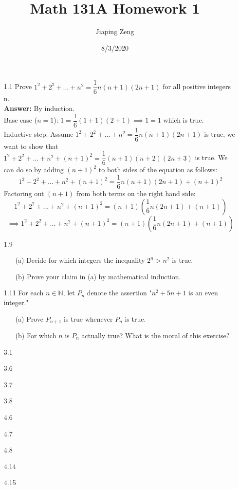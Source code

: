 \documentclass{article}
\title{Math 131A Homework 1}
\date{8/3/2020}
\author{Jiaping Zeng}
\begin{document}
\maketitle

\begin{itemize}
    \item [1.1] Prove $1^2+2^2+...+n^2=\dfrac{1}{6}n(n+1)(2n+1)$ for all positive integers n.\\\textbf{Answer: } By induction. \\
    Base case ($n=1$): $1=\dfrac{1}{6}(1+1)(2+1)\implies1=1$ which is true. \\
    Inductive step: Assume $1^2+2^2+...+n^2=\dfrac{1}{6}n(n+1)(2n+1)$ is true, we want to show that $1^2+2^2+...+n^2+(n+1)^2=\dfrac{1}{6}(n+1)(n+2)(2n+3)$ is true. We can do so by adding $(n+1)^2$ to both sides of the equation as follows: 
    \[1^2+2^2+...+n^2+(n+1)^2=\dfrac{1}{6}n(n+1)(2n+1)+(n+1)^2\]
    Factoring out $(n+1)$ from both terms on the right hand side:
    \[1^2+2^2+...+n^2+(n+1)^2=(n+1)(\dfrac{1}{6}n(2n+1)+(n+1))\]
    \[\implies1^2+2^2+...+n^2+(n+1)^2=(n+1)(\dfrac{1}{6}n(2n+1)+(n+1))\]
    \item [1.9]
          \begin{itemize}
              \item [(a)] Decide for which integers the inequality $2^n>n^2$ is true.
              \item [(b)] Prove your claim in (a) by mathematical induction.
          \end{itemize}
    \item [1.11] For each $n\in\mathbb{N}$, let $P_n$ denote the assertion "$n^2+5n+1$ is an even integer."
          \begin{itemize}
              \item [(a)] Prove $P_{n+1}$ is true whenever $P_n$ is true.
              \item [(b)] For which $n$ is $P_n$ actually true? What is the moral of this exercise?
          \end{itemize}
    \item [3.1]
    \item [3.6]
    \item [3.7]
    \item [3.8]
    \item [4.6]
    \item [4.7]
    \item [4.8]
    \item [4.14]
    \item [4.15]

\end{itemize}
\end{document}
